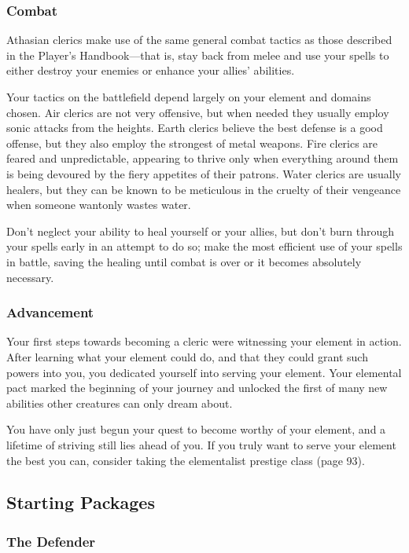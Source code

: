 \subsubsection{Combat}
Athasian clerics make use of the same general combat tactics as those described in the Player's Handbook---that is, stay back from melee and use your spells to either destroy your enemies or enhance your allies' abilities.

Your tactics on the battlefield depend largely on your element and domains chosen. Air clerics are not very offensive, but when needed they usually employ sonic attacks from the heights. Earth clerics believe the best defense is a good offense, but they also employ the strongest of metal weapons. Fire clerics are feared and unpredictable, appearing to thrive only when everything around them is being devoured by the fiery appetites of their patrons. Water clerics are usually healers, but they can be known to be meticulous in the cruelty of their vengeance when someone wantonly wastes water.

Don't neglect your ability to heal yourself or your allies, but don't burn through your spells early in an attempt to do so; make the most efficient use of your spells in battle, saving the healing until combat is over or it becomes absolutely necessary.

\subsubsection{Advancement}
Your first steps towards becoming a cleric were witnessing your element in action. After learning what your element could do, and that they could grant such powers into you, you dedicated yourself into serving your element. Your elemental pact marked the beginning of your journey and unlocked the first of many new abilities other creatures can only dream about.

You have only just begun your quest to become worthy of your element, and a lifetime of striving still lies ahead of you. If you truly want to serve your element the best you can, consider taking the elementalist prestige class (page 93).

\subsection{Starting Packages}
\subsubsection{The Defender}

